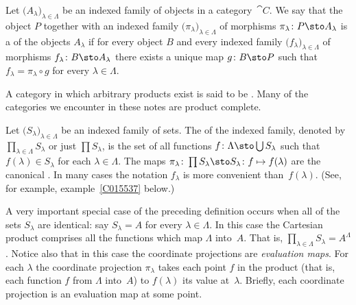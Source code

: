 \begin{defn}\label{C015524} Let $\bigl(A_\lambda\bigr)_{\lambda \in \Lambda}$ be an
indexed family of objects in a category~$\cat C$. We say that the object $P$ together
with an indexed family $\bigl(\pi_\lambda\bigr)_{\lambda \in \Lambda}$ of morphisms
$\pi_\lambda\colon P \sto A_\lambda$ is a
 of the objects $A_\lambda$ if for every object $B$ and every indexed family
$\bigl(f_\lambda\bigr)_{\lambda \in \Lambda}$ of morphisms $f_\lambda\colon B \sto
A_\lambda$ there exists a unique map $g \colon B \sto P$ such that $f_\lambda =
\pi_\lambda \circ g$ for every $\lambda \in \Lambda$.
\end{defn}

A category in which arbitrary products exist is said to be
.  Many of the categories we encounter in these notes are product
complete.

\begin{defn}\label{C015531} Let $\bigl(S_\lambda\bigr)_{\lambda \in \Lambda}$ be an indexed
family of sets. The
 of the indexed family, denoted by
$\prod_{\lambda \in \Lambda} S_\lambda$ or just $\prod S_\lambda$, is the set of all
functions $f \colon \Lambda \sto \bigcup S_\lambda$ such that $f(\lambda) \in S_\lambda$
for each $\lambda \in \Lambda$.  The maps $\pi_\lambda \colon \prod S_\lambda \sto
S_\lambda \colon f \mapsto f(\lambda)$ are the canonical
. In many cases the notation $f_\lambda$ is more convenient
than~$f(\lambda)$.  (See, for example, example~\ref{C015537} below.)
\end{defn}

\begin{exam}\label{C015534} A very important special case of the preceding definition occurs
when all of the sets $S_\lambda$ are identical: say $S_\lambda = A$ for every $\lambda
\in \Lambda$.  In this case the Cartesian product comprises all the functions which map
$\Lambda$ into~$A$. That is, $\prod_{\lambda \in \Lambda} S_\lambda = A^\Lambda$. Notice
also that in this case the coordinate projections are
\emph{evaluation maps}. For each $\lambda$ the coordinate projection $\pi_\lambda$ takes
each point $f$ in the product (that is, each function $f$ from $\Lambda$ into~$A$) to
$f(\lambda)$ its value at~$\lambda$.  Briefly, each coordinate projection is an
evaluation map at some point.
\end{exam}

